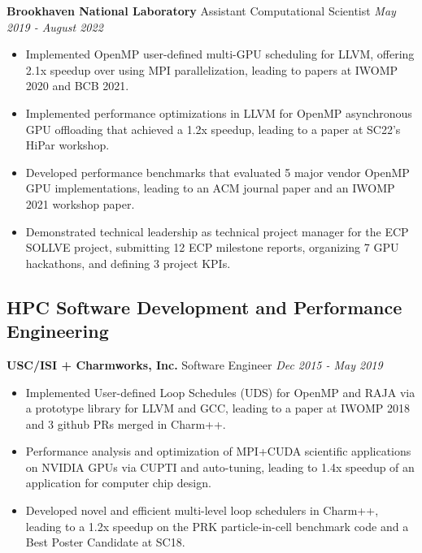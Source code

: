 \newcommand{\myExpFour}{
   \item Implemented OpenMP user-defined multi-GPU scheduling for LLVM, offering 2.1x speedup over using MPI parallelization, leading to papers at IWOMP 2020 and BCB 2021.
   \item Implemented performance optimizations in LLVM for OpenMP asynchronous GPU offloading that achieved a 1.2x speedup, leading to a paper at SC22's HiPar workshop. 
   \item Developed performance benchmarks that evaluated 5 major vendor OpenMP GPU implementations, leading to an ACM journal paper and an IWOMP 2021 workshop paper. 
   \item Demonstrated technical leadership as technical project manager for the ECP SOLLVE project, submitting 12 ECP milestone reports, organizing 7 GPU hackathons, and defining 3 project KPIs.
   }
\noindent
\textbf{Brookhaven National Laboratory}\hfill
{Assistant Computational Scientist} \hfill \textit{May 2019 - August 2022}
\begin{itemize}[itemsep=-0.1em]
\myExpFour
\end{itemize}


\subsection*{HPC Software Development and Performance Engineering}
\newcommand{\myExpFive}{
\item Implemented User-defined Loop Schedules (UDS) for OpenMP and RAJA via a prototype library for LLVM and GCC, leading to a paper at IWOMP 2018 and 3 github PRs merged in Charm++. 
\item Performance analysis and optimization of MPI+CUDA scientific applications on NVIDIA GPUs via CUPTI and auto-tuning, leading to 1.4x speedup of an application for computer chip design.
\item Developed novel and efficient multi-level loop schedulers in Charm++, leading to a 1.2x speedup on the PRK particle-in-cell benchmark code and a Best Poster Candidate at SC18.
} 
\noindent
\textbf{USC/ISI + Charmworks, Inc.}\hfill
{Software Engineer} \hfill \textit{Dec 2015 - May 2019}
\vspace{-0.0in}
\begin{itemize}[itemsep=-0.1em]
\myExpFive
\end{itemize}

